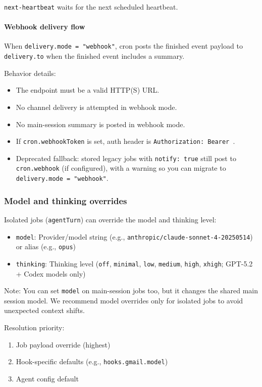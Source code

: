 \texttt{next-heartbeat} waits for the next scheduled heartbeat.

\paragraph{Webhook delivery flow}


When \texttt{delivery.mode = "webhook"}, cron posts the finished event payload to \texttt{delivery.to} when the finished event includes a summary.

Behavior details:

\begin{itemize}
  \item The endpoint must be a valid HTTP(S) URL.
  \item No channel delivery is attempted in webhook mode.
  \item No main-session summary is posted in webhook mode.
  \item If \texttt{cron.webhookToken} is set, auth header is \texttt{Authorization: Bearer }.
  \item Deprecated fallback: stored legacy jobs with \texttt{notify: true} still post to \texttt{cron.webhook} (if configured), with a warning so you can migrate to \texttt{delivery.mode = "webhook"}.
\end{itemize}


\subsubsection{Model and thinking overrides}


Isolated jobs (\texttt{agentTurn}) can override the model and thinking level:

\begin{itemize}
  \item \texttt{model}: Provider/model string (e.g., \texttt{anthropic/claude-sonnet-4-20250514}) or alias (e.g., \texttt{opus})
  \item \texttt{thinking}: Thinking level (\texttt{off}, \texttt{minimal}, \texttt{low}, \texttt{medium}, \texttt{high}, \texttt{xhigh}; GPT-5.2 + Codex models only)
\end{itemize}


Note: You can set \texttt{model} on main-session jobs too, but it changes the shared main
session model. We recommend model overrides only for isolated jobs to avoid
unexpected context shifts.

Resolution priority:

\begin{enumerate}
  \item Job payload override (highest)
  \item Hook-specific defaults (e.g., \texttt{hooks.gmail.model})
  \item Agent config default
\end{enumerate}


